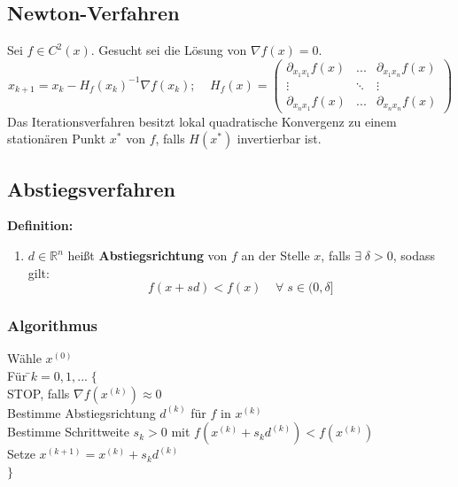 \documentclass[4pt,a4paper]{scrartcl}
\begin{document}
\begin{multicols}{4}
\subsection{Newton-Verfahren}
Sei $f\in C^2(x)$. Gesucht sei die Lösung von $\nabla f(x)=0$.
\begin{equation*}
x_{k+1}=x_k-H_f(x_k)^{-1}\nabla f(x_k);\;\;\;\;H_f(x)=\begin{pmatrix}\partial_{x_1x_1} f(x) & ... & \partial_{x_1x_n}f(x) \\ \vdots & \ddots & \vdots \\ \partial_{x_nx_1}f(x) & ... & \partial_{x_nx_n}f(x)\end{pmatrix}
\end{equation*}
Das Iterationsverfahren besitzt lokal quadratische Konvergenz zu einem stationären Punkt $x^*$ von $f$, falls $H(x^*)$ invertierbar ist.

\subsection{Abstiegsverfahren}
\textbf{Definition:}
\begin{enumerate}[label=$\bullet$]
\item $d\in\mathbb{R}^n$ heißt \textbf{Abstiegsrichtung} von $f$ an der Stelle $x$, falls $\exists\;\delta>0$, sodass gilt:
\begin{equation*}
f(x+sd)<f(x)\;\;\;\;\forall\;s\in(0,\delta]
\end{equation*}
\end{enumerate}

\subsubsection{Algorithmus}
\begin{tabbing}
Wähle $x^{(0)}$\\
Für \=$k=0,1,...\;\{$\\
\> STOP, falls $\nabla f\left(x^{(k)}\right)\approx 0$\\
\> Bestimme Abstiegsrichtung $d^{(k)}$ für $f$ in $x^{(k)}$\\
\>Bestimme Schrittweite $s_k>0$ mit $f\left(x^{(k)}+s_kd^{(k)}\right)<f\left(x^{(k)}\right)$\\
\> Setze $x^{(k+1)}=x^{(k)}+s_kd^{(k)}$\\
$\}$
\end{tabbing}


\end{multicols}
\end{document}
